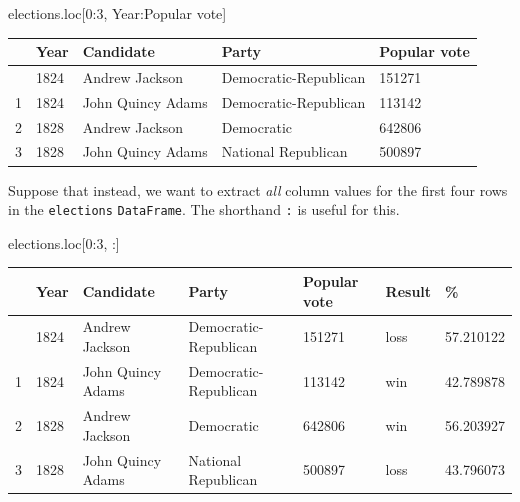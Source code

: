 \documentclass[
  letterpaper,
  DIV=11,
  numbers=noendperiod]{scrreprt}
\newenvironment{Shaded}{\begin{snugshade}}{\end{snugshade}}
\newcommand{\DecValTok}[1]{\textcolor[rgb]{0.68,0.00,0.00}{#1}}
\newcommand{\NormalTok}[1]{\textcolor[rgb]{0.00,0.23,0.31}{#1}}
\newcommand{\StringTok}[1]{\textcolor[rgb]{0.13,0.47,0.30}{#1}}
\begin{document}
\begin{Shaded}
\begin{Highlighting}[]
\NormalTok{elections.loc[}\DecValTok{0}\NormalTok{:}\DecValTok{3}\NormalTok{, }\StringTok{\textquotesingle{}Year\textquotesingle{}}\NormalTok{:}\StringTok{\textquotesingle{}Popular vote\textquotesingle{}}\NormalTok{]}
\end{Highlighting}
\end{Shaded}

\begin{longtable}[]{@{}lllll@{}}
\toprule\noalign{}
& Year & Candidate & Party & Popular vote \\
\midrule\noalign{}
\endhead
\bottomrule\noalign{}
\endlastfoot
0 & 1824 & Andrew Jackson & Democratic-Republican & 151271 \\
1 & 1824 & John Quincy Adams & Democratic-Republican & 113142 \\
2 & 1828 & Andrew Jackson & Democratic & 642806 \\
3 & 1828 & John Quincy Adams & National Republican & 500897 \\
\end{longtable}

Suppose that instead, we want to extract \emph{all} column values for
the first four rows in the \texttt{elections} \texttt{DataFrame}. The
shorthand \texttt{:} is useful for this.

\begin{Shaded}
\begin{Highlighting}[]
\NormalTok{elections.loc[}\DecValTok{0}\NormalTok{:}\DecValTok{3}\NormalTok{, :]}
\end{Highlighting}
\end{Shaded}

\begin{longtable}[]{@{}lllllll@{}}
\toprule\noalign{}
& Year & Candidate & Party & Popular vote & Result & \% \\
\midrule\noalign{}
\endhead
\bottomrule\noalign{}
\endlastfoot
0 & 1824 & Andrew Jackson & Democratic-Republican & 151271 & loss &
57.210122 \\
1 & 1824 & John Quincy Adams & Democratic-Republican & 113142 & win &
42.789878 \\
2 & 1828 & Andrew Jackson & Democratic & 642806 & win & 56.203927 \\
3 & 1828 & John Quincy Adams & National Republican & 500897 & loss &
43.796073 \\
\end{longtable}
\end{document}
